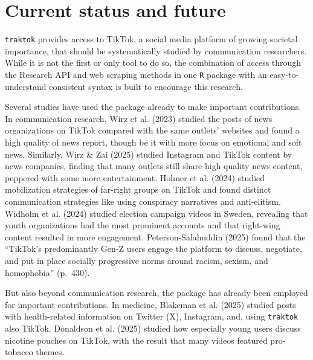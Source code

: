 \documentclass[
  nobib]{ccr}
\begin{document}
\section{Current status and future}\label{current-status-and-future}

\texttt{traktok} provides access to TikTok, a social media platform of
growing societal importance, that should be systematically studied by
communication researchers. While it is not the first or only tool to do
so, the combination of access through the Research API and web scraping
methods in one \texttt{R} package with an easy-to-understand consistent
syntax is built to encourage this research.

Several studies have used the package already to make important
contributions. In communication research, Wirz et al. (2023) studied the
posts of news organizations on TikTok compared with the same outlets'
websites and found a high quality of news report, though be it with more
focus on emotional and soft news. Similarly, Wirz \& Zai (2025) studied
Instagram and TikTok content by news companies, finding that many
outlets still share high quality news content, peppered with some more
entertainment. Hohner et al. (2024) studied mobilization strategies of
far-right groups on TikTok and found distinct communication strategies
like using conspiracy narratives and anti-elitism. Widholm et al. (2024)
studied election campaign videos in Sweden, revealing that youth
organizations had the most prominent accounts and that right-wing
content resulted in more engagement. Peterson-Salahuddin (2025) found
that the ``TikTok's predominantly Gen-Z users engage the platform to
discuss, negotiate, and put in place socially progressive norms around
racism, sexism, and homophobia'' (p.~430).

But also beyond communication research, the package has already been
employed for important contributions. In medicine, Blakeman et al.
(2025) studied posts with health-related information on Twitter (X),
Instagram, and, using \texttt{traktok} also TikTok. Donaldson et al.
(2025) studied how especially young users discuss nicotine pouches on
TikTok, with the result that many videos featured pro-tobacco themes.
\end{document}
